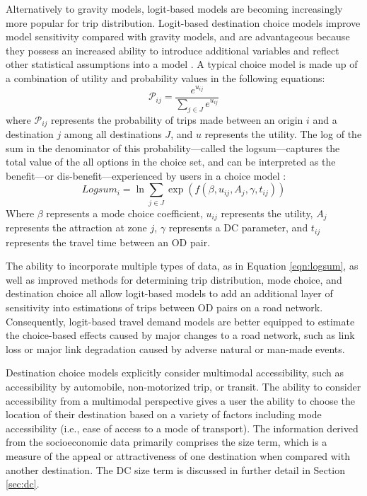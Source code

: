 Alternatively to gravity models, logit-based models are becoming
increasingly more popular for trip distribution. Logit-based destination choice models improve model
sensitivity compared with gravity models, and are advantageous because
they possess an increased ability to introduce additional variables and reflect
other statistical assumptions into a model \citep{tfr2021}. A typical choice
model is made up of a combination of utility and probability values in the
following equations:
\begin{equation}
\mathcal{P}_{ij} = \frac{e^{u_{ij}}}{\sum_{j\in J}e^{u_{ij}}}
  \label{eqn:probability}
\end{equation}
\noindent where $\mathcal{P}_{ij}$ represents the probability of trips made between an
origin \(i\) and a destination \(j\) among all destinations $J$, and \(u\) represents the utility.
The log of the sum in the denominator of this probability---called the logsum---captures the total value of the all options in the choice set, and can be interpreted as the
benefit---or dis-benefit---experienced by users in a choice model \citep{williams1974}:
\begin{equation}
 Logsum_{i} = \ln\sum_{j\in J}\exp(f(\beta, u_{ij}, A_j, \gamma, t_{ij}))
  \label{eqn:logsum}
\end{equation}
Where $\beta$ represents a mode choice coefficient, $u_{ij}$ represents the utility,
$A_j$ represents the attraction at zone $j$, $\gamma$ represents
a DC parameter, and $t_{ij}$ represents the travel time between an OD pair.

The ability to incorporate multiple types of data, as in Equation \ref{eqn:logsum}, as well as improved methods
for determining trip distribution, mode choice, and destination choice all allow
logit-based models to add an additional layer of sensitivity into estimations of
trips between OD pairs on a road network. Consequently, logit-based travel
demand models are better equipped to estimate the choice-based effects caused
by major changes to a road network, such as link loss or major link degradation
caused by adverse natural or man-made events.

Destination choice models explicitly consider multimodal accessibility, such as accessibility by automobile,
non-motorized trip, or transit. The ability to consider accessibility from a
multimodal perspective gives a user the ability to choose the location of
their destination based on a variety of factors including mode accessibility
(i.e., ease of access to a mode of transport). The information
derived from the socioeconomic data primarily comprises the size term, which
is a measure of the appeal or attractiveness of one destination when compared with
another destination. The DC size term is discussed in further detail in
Section \ref{sec:dc}.

